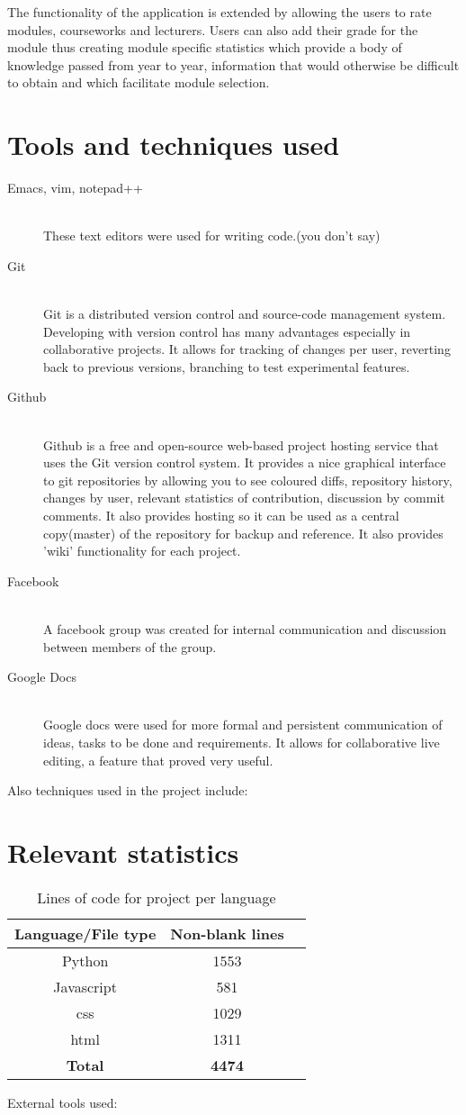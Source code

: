 \documentclass[12pt,a4paper,titlepage]{article}
\begin{document}
The functionality of the application is extended by allowing the users to rate modules, courseworks and lecturers. Users can also add their grade for the module thus creating module specific statistics which provide a body of knowledge passed from year to year, information that would otherwise be difficult to obtain and which facilitate module selection. 
\newpage
\section{Tools and techniques used}
 \begin{description}
  \item[Emacs, vim, notepad++] \hfill \\
  These text editors were used for writing code.(you don't say)
  \item[Git] \hfill \\
  Git is a distributed version control and source-code management system. Developing with version control has many advantages especially in collaborative projects. It allows for tracking of changes per user, reverting back to previous versions, branching to test experimental features. 
  \item[Github] \hfill \\
  Github is a free and open-source web-based project hosting service that uses the Git version control system.  It provides a nice graphical interface to git repositories by allowing you to see coloured diffs, repository history, changes by user, relevant statistics of contribution, discussion by commit comments. It also provides hosting so it can be used as a central copy(master) of the repository for backup and reference. It also provides 'wiki' functionality for each project.
\item[Facebook] \hfill \\
  A facebook group was created for internal communication and discussion between members of the group. 
\item[Google Docs] \hfill \\
  Google docs were used for more formal and persistent communication of ideas, tasks to be done and requirements. It allows for collaborative live editing, a feature that proved very useful.
\end{description}
Also techniques used in the project include:
\newpage
\section{Relevant statistics}
\begin{table}[!htbp]
\centering
\begin{tabular}{| c |c |c|}
\hline
\bf{Language/File type} & \bf{Non-blank lines}\\
\hline
Python & 1553\\
\hline
Javascript & 581 \\
\hline
css & 1029 \\
\hline
html & 1311\\
\hline
\bf{Total} & \bf{4474}\\
\hline
\end{tabular}
\caption{Lines of code for project per language}
\end{table}
External tools used:
\newpage
\end{document}
